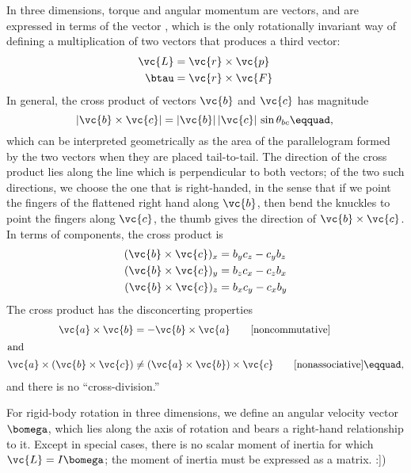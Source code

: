 \begin{summary}
\begin{summarytext}
	In three dimensions, torque and angular momentum are vectors, and are expressed
	in terms of the vector , which is the only
	rotationally invariant way of defining a multiplication of two vectors
	that produces a third vector:
	\begin{align*}
		\vc{L}	&= \vc{r}\times\vc{p}\\
		\btau	&= \vc{r}\times\vc{F}
	\end{align*}
	In general, the cross product of vectors $\vc{b}$ and $\vc{c}$ has
	magnitude
	\begin{equation*}
		|\vc{b}\times\vc{c}|	= |\vc{b}|\,|\vc{c}|\,\sin\theta_{bc}\eqquad,\\
	\end{equation*}
	which can be interpreted geometrically as the area of the parallelogram
	formed by the two vectors when they are placed tail-to-tail.
	The direction of the cross product lies along the line which is perpendicular
	to both vectors; of the two such directions, we choose the one that is right-handed,
	in the sense that if we point the fingers of the flattened right hand along
	$\vc{b}$, then bend the knuckles to point the fingers along $\vc{c}$, the thumb
	gives the direction of $\vc{b}\times\vc{c}$. In terms of components, the
	cross product is
	\begin{align*}
	(\vc{b}\times\vc{c})_x	&=  b_yc_z - c_yb_z\\
	(\vc{b}\times\vc{c})_y	&=  b_zc_x - c_zb_x\\
	(\vc{b}\times\vc{c})_z	&=  b_xc_y - c_xb_y
	\end{align*}
	The  cross product 
	has the disconcerting properties
	\begin{align*}
		\vc{a}\times\vc{b} &= -\vc{b}\times\vc{a} \qquad \text{[noncommutative]}\\
		\intertext{and}
		\vc{a}\times(\vc{b}\times\vc{c}) &\ne (\vc{a}\times\vc{b})\times\vc{c} \qquad \text{[nonassociative]}\eqquad,
	\end{align*}
	and there is no ``cross-division.''
	
	For rigid-body rotation in three dimensions, we define an angular velocity
	vector $\bomega$, which lies along the axis of rotation and bears a right-hand
	relationship to it. Except in special cases, there is no scalar moment of
	inertia for which $\vc{L}=I\bomega$; the moment of inertia must be expressed
	as a matrix.
:])

\end{summarytext}

\end{summary}
